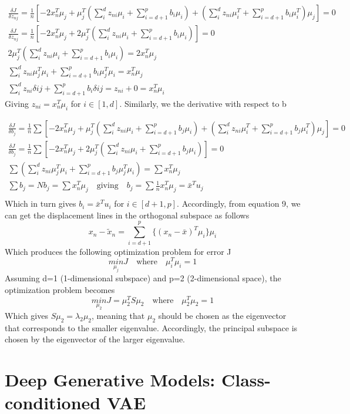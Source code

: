 \documentclass[12pt,a4paper]{article}
\begin{document}
	\vspace{-0.3cm}
	\begin{align*}
		\frac{\delta J}{\delta z_{nj}} = \frac{1}{n}[ -2x_n^T\mu_j+\mu_j^T(\sum_{i}^{d}z_{ni}\mu_i + \sum_{i=d+1}^{p}b_i\mu_i) + (\sum_{i}^{d}z_{ni}\mu_i^T + \sum_{i=d+1}^{p}b_i\mu_i^T)\mu_j] = 0 \\ 
		\frac{\delta J}{\delta z_{nj}} = \frac{1}{n}[ -2x_n^T\mu_j + 2 \mu_j^T(\sum_{i}^{d}z_{ni}\mu_i + \sum_{i=d+1}^{p}b_i\mu_i)] = 0 \qquad \qquad \\ 
		2 \mu_j^T(\sum_{i}^{d}z_{ni}\mu_i + \sum_{i=d+1}^{p}b_i\mu_i)= 2x_n^T\mu_j \qquad \qquad\qquad \quad\\
		\sum_{i}^{d}z_{ni}\mu_j^T\mu_i + \sum_{i=d+1}^{p}b_i\mu_j^T\mu_i=  x_n^T\mu_j \qquad \qquad\qquad \quad \\
		\sum_{i}^{d}z_{ni}\delta ij + \sum_{i=d+1}^{p}b_i\delta ij = z_{ni}+0 = x_n^T\mu_i \qquad \qquad\qquad \quad
	\end{align*}
	Giving $z_{ni}= x_n^T\mu_i$ for $i\in [1,d]$. Similarly, we the derivative with respect to b

	\vspace{-0.3cm}
	\begin{align*}
		\frac{\delta J}{\delta b_{j}} = \frac{1}{n}\sum[ -2x_n^T\mu_j+\mu_j^T(\sum_{i}^{d}z_{ni}\mu_i + \sum_{i=d+1}^{p}b_j\mu_i) + (\sum_{i}^{d}z_{ni}\mu_i^T + \sum_{i=d+1}^{p}b_j\mu_i^T)\mu_j] = 0 \\ 
		\frac{\delta J}{\delta b_{j}} = \frac{1}{n}\sum[ -2x_n^T\mu_j + 2 \mu_j^T(\sum_{i}^{d}z_{ni}\mu_i + \sum_{i=d+1}^{p}b_j\mu_i)] = 0 \qquad \qquad \\ 
		\sum(\sum_{i}^{d}z_{ni}\mu_j^T\mu_i + \sum_{i=d+1}^{p}b_j\mu_j^T\mu_i)=  \sum x_n^T\mu_j \qquad \qquad\qquad \quad \\
		\sum b_j= Nb_j =\sum x_n^T\mu_j \quad \text{giving}\quad b_j = \sum \frac{1}{n}x_n^T\mu_j = \bar{x}^Tu_j\qquad\qquad\\
	\end{align*}
	Which in turn gives $b_i=\bar{x}^Tu_i$ for $i\in [d+1,p]$. Accordingly, from equation 9, we can get the displacement lines in the orthogonal subspace as follows
	\begin{equation}
		x_n - \widetilde{x}_n = \sum_{i=d+1}^{p}\{(x_n-\bar{x})^T\mu_i\}\mu_i
	\end{equation}
	Which produces the following optimization problem for error J
	\begin{equation}
		\underset{\mu_j}{min} J \quad \text{where} \quad \mu_i^T\mu_i=1
	\end{equation}
	Assuming d=1 (1-dimensional subspace) and p=2 (2-dimensional space), the optimization problem becomes
	\begin{equation}
		\underset{\mu_2}{min} J = \mu_2^TS\mu_2 \quad \text{where} \quad \mu_2^T\mu_2=1
	\end{equation}
	Which gives $S\mu_2 = \lambda_2 \mu_2$, meaning that $\mu_2$ should be chosen as the eigenvector that corresponds to the smaller eigenvalue. Accordingly, the principal subspace is chosen by the eigenvector of the larger eigenvalue.
	
	\section{Deep Generative Models: Class-conditioned VAE}

	
\end{document}
